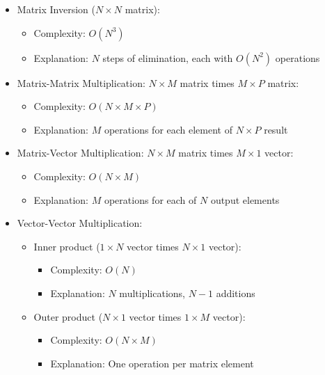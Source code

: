 \documentclass[11pt, %
	oneside, %
	english, %
	onehalfspacing, %
	parskip, %
	]{article} %
\theoremstyle{definition}
\begin{document}
\begin{itemize}
	\item Matrix Inversion ($N \times N$ matrix):
	\begin{itemize}
		\item Complexity: $O(N^3)$
		\item Explanation: $N$ steps of elimination, each with $O(N^2)$ operations
	\end{itemize}
	\item Matrix-Matrix Multiplication: $N \times M$ matrix times $M \times P$ matrix:
	\begin{itemize}
		\item Complexity: $O(N \times M \times P)$
		\item Explanation: $M$ operations for each element of $N \times P$ result
	\end{itemize}
	\item Matrix-Vector Multiplication: $N \times M$ matrix times $M \times 1$ vector:
		\begin{itemize}
			\item Complexity: $O(N \times M)$
			\item Explanation: $M$ operations for each of $N$ output elements
		\end{itemize}
	\item Vector-Vector Multiplication:
	\begin{itemize}
		\item Inner product ($1 \times N$ vector times $N \times 1$ vector):
		\begin{itemize}
			\item Complexity: $O(N)$
			\item Explanation: $N$ multiplications, $N-1$ additions
		\end{itemize}
		\item Outer product ($N \times 1$ vector times $1 \times M$ vector):
		\begin{itemize}
			\item Complexity: $O(N \times M)$
			\item Explanation: One operation per matrix element
		\end{itemize}
	\end{itemize}
\end{itemize}
\end{document}
